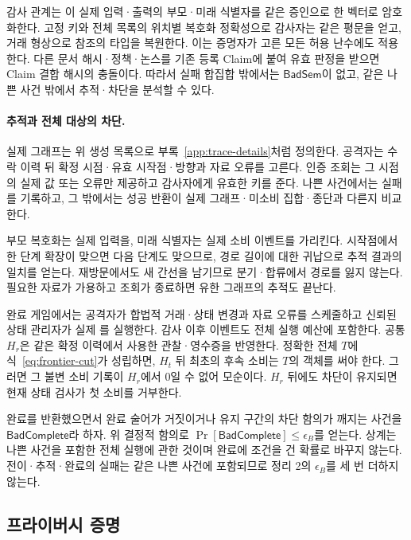 감사 관계는 이 실제 입력·출력의 부모·미래 식별자를 같은 증인으로
한 벡터로 암호화한다. 고정 키와 전체 목록의 위치별 복호화 정확성으로
감사자는 같은 평문을 얻고, 거래 형상으로 참조의 타입을 복원한다.
이는 증명자가 고른 모든 허용 난수에도 적용한다. 다른 문서 해시·정책·논스를 기존
등록 Claim에 붙여 유효 판정을 받으면 Claim 결합 해시의 충돌이다.
따라서 실패 합집합 밖에서는 $\mathsf{BadSem}$이 없고,
같은 나쁜 사건 밖에서 추적·차단을 분석할 수 있다.

\paragraph{추적과 전체 대상의 차단.}
실제 그래프는 위 생성 목록으로 부록~\ref{app:trace-details}처럼 정의한다.
공격자는 수락 이력 뒤 확정 시점·유효 시작점·방향과 자료 오류를 고른다.
인증 조회는 그 시점의 실제 값 또는 오류만 제공하고 감사자에게
유효한 키를 준다. 나쁜 사건에서는 실패를 기록하고,
그 밖에서는 성공 반환이 실제 그래프·미소비 집합·종단과 다른지 비교한다.

부모 복호화는 실제 입력을, 미래 식별자는 실제 소비 이벤트를 가리킨다.
시작점에서 한 단계 확장이 맞으면 다음 단계도 맞으므로,
경로 길이에 대한 귀납으로 추적 결과의 일치를 얻는다.
재방문에서도 새 간선을 남기므로 분기·합류에서 경로를 잃지 않는다.
필요한 자료가 가용하고 조회가 종료하면 유한 그래프의 추적도 끝난다.

완료 게임에서는 공격자가 합법적 거래·상태 변경과 자료 오류를
스케줄하고 신뢰된 상태 관리자가 실제 를 실행한다.
감사 이후 이벤트도 전체 실행 예산에 포함한다.
공통 $H_r$은 같은 확정 이력에서 사용한 관찰·영수증을 반영한다.
정확한 전체 $T$에 식~\eqref{eq:frontier-cut}가 성립하면,
$H_t$ 뒤 최초의 후속 소비는 $T$의 객체를 써야 한다.
그러면 그 불변 소비 기록이 $H_r$에서 0일 수 없어 모순이다.
$H_r$ 뒤에도 차단이 유지되면 현재 상태 검사가 첫 소비를 거부한다.

완료를 반환했으면서 완료 술어가 거짓이거나 유지 구간의 차단 함의가
깨지는 사건을 $\mathsf{BadComplete}$라 하자.
위 결정적 함의로 $\Pr[\mathsf{BadComplete}]\leq\epsilon_B$를 얻는다.
상계는 나쁜 사건을 포함한 전체 실행에 관한 것이며
완료에 조건을 건 확률로 바꾸지 않는다.
전이·추적·완료의 실패는 같은 나쁜 사건에 포함되므로
정리 2의 $\epsilon_B$를 세 번 더하지 않는다.

\subsection{프라이버시 증명}
\label{app:privacy-details}


